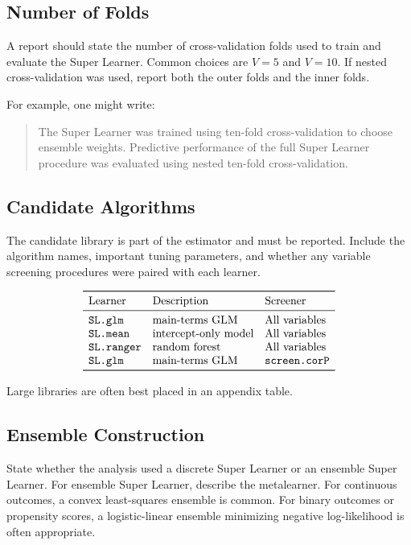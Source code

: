 \label{lec:6-8}

\subsection{Number of Folds}

A report should state the number of cross-validation folds used to train and evaluate
the Super Learner. Common choices are $V=5$ and $V=10$. If nested cross-validation
was used, report both the outer folds and the inner folds.

For example, one might write:
\begin{quote}
The Super Learner was trained using ten-fold cross-validation to choose ensemble
weights. Predictive performance of the full Super Learner procedure was evaluated
using nested ten-fold cross-validation.
\end{quote}

\subsection{Candidate Algorithms}

The candidate library is part of the estimator and must be reported. Include the
algorithm names, important tuning parameters, and whether any variable screening
procedures were paired with each learner.

\[
\begin{array}{lll}
\toprule
\text{Learner} & \text{Description} & \text{Screener}\\
\midrule
\texttt{SL.glm} & \text{main-terms GLM} & \text{All variables}\\
\texttt{SL.mean} & \text{intercept-only model} & \text{All variables}\\
\texttt{SL.ranger} & \text{random forest} & \text{All variables}\\
\texttt{SL.glm} & \text{main-terms GLM} & \texttt{screen.corP}\\
\bottomrule
\end{array}
\]

Large libraries are often best placed in an appendix table.

\subsection{Ensemble Construction}

State whether the analysis used a discrete Super Learner or an ensemble Super
Learner. For ensemble Super Learner, describe the metalearner. For continuous
outcomes, a convex least-squares ensemble is common. For binary outcomes or
propensity scores, a logistic-linear ensemble minimizing negative log-likelihood is
often appropriate.

